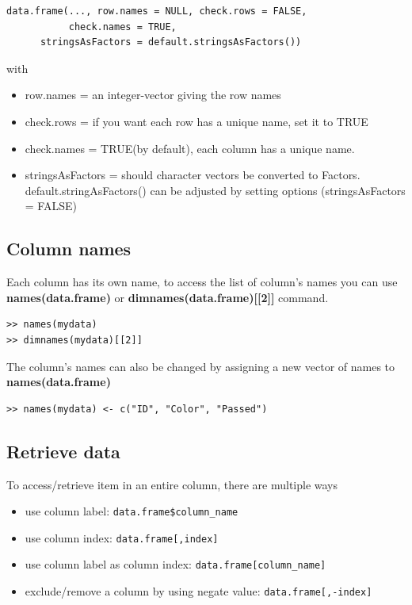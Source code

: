 \begin{lstlisting}
data.frame(..., row.names = NULL, check.rows = FALSE,
           check.names = TRUE,
      stringsAsFactors = default.stringsAsFactors())
\end{lstlisting}
with
\begin{itemize}
\item row.names = an integer-vector giving the row names
\item check.rows = if you want each row has a unique name, set it to
  TRUE 
\item check.names = TRUE(by default), each column has a unique name.
\item stringsAsFactors = should character vectors be converted to
  Factors.  default.stringAsFactors() can be adjusted by setting
  options (stringsAsFactors = FALSE)
\end{itemize}

\subsection{Column names}
\label{sec:column-names}

Each column has its own name, to access the list of column's names you
can use {\bf names(data.frame)} or {\bf dimnames(data.frame)[[2]]}
command.

\begin{lstlisting}
>> names(mydata)
>> dimnames(mydata)[[2]]
\end{lstlisting}

The column's names can also be changed by assigning a new vector of
names to {\bf names(data.frame)}

\begin{lstlisting}
>> names(mydata) <- c("ID", "Color", "Passed")
\end{lstlisting}

\subsection{Retrieve data}
\label{sec:retrieve-data}


To access/retrieve item in an entire column, there are multiple ways
\begin{itemize}
\item use column label: \verb!data.frame$column_name!
\item use column index: \verb!data.frame[,index]!
\item use column label as column index: \verb!data.frame[column_name]!
\item exclude/remove a column by using negate value:
  \verb!data.frame[,-index]!
\end{itemize}

